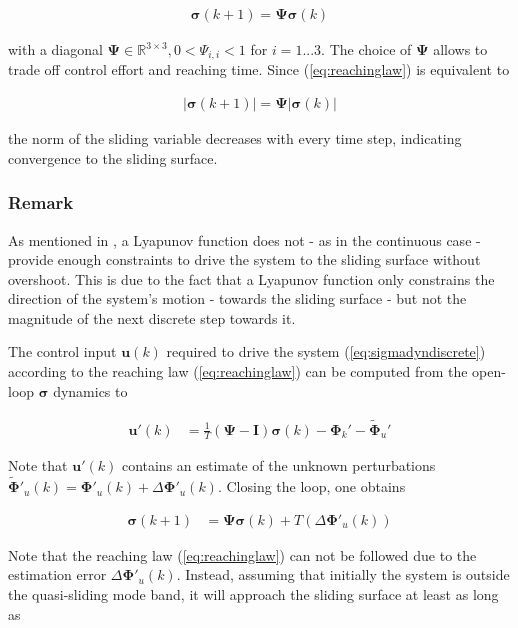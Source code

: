 \documentclass{ifacconf}
\providecommand{\mbf}[1]{\mathbf{#1}}
\newcommand{\idxSample}{{\ensuremath{k}}}
\begin{document}
\begin{align}
\mbf{\sigma}(\idxSample+1) = \mbf{\Psi} \mbf{\sigma}(\idxSample)
\label{eq:reachinglaw}
\end{align}

with a diagonal $\mbf{\Psi} \in \mathbb{R}^{3 \times 3}, 0 < \Psi_{i,i} < 1$ for $i=1...3$. The choice of $\mbf{\Psi}$ allows to trade off control effort and reaching time.
Since (\ref{eq:reachinglaw}) is equivalent to

\begin{align}
|\mbf{\sigma}(\idxSample+1)| = \mbf{\Psi} |\mbf{\sigma}(\idxSample)|
\end{align}

the norm of the sliding variable decreases with every time step, indicating convergence to the sliding surface. 

\subsubsection{Remark} As mentioned in \cite{monsees2001discrete}, a Lyapunov function does not - as in the continuous case - provide enough constraints to drive the system to the sliding surface without overshoot. This is due to the fact that a Lyapunov function only constrains the direction of the system's motion - towards the sliding surface - but not the magnitude of the next discrete step towards it. 

The control input $\mbf{u}(\idxSample)$ required to drive the system (\ref{eq:sigmadyndiscrete}) according to the reaching law (\ref{eq:reachinglaw}) can be computed from the open-loop $\mbf{\sigma}$ dynamics to

\begin{align}
\mbf{u}'(\idxSample) &= \frac{1}{T}(\mbf{\Psi} - \mbf{I})\mbf{\sigma}(\idxSample) - \mbf{\Phi}_k' - \tilde{\mbf{\Phi}}_u'
\end{align}

Note that $\mbf{u}'(\idxSample)$ contains an estimate of the unknown perturbations $\tilde{\mbf{\Phi}}'_u(\idxSample) = \mbf{\Phi}'_u(\idxSample) + \Delta \mbf{\Phi}'_u(\idxSample)$. Closing the loop, one obtains

\begin{align}
\mbf{\sigma}(\idxSample+1) &= \mbf{\Psi} \mbf{\sigma}(\idxSample) +
T (\Delta \mbf{\Phi}'_u(\idxSample))
\end{align}

Note that the reaching law (\ref{eq:reachinglaw}) can not be followed due to the estimation error $\Delta \mbf{\Phi}'_u(\idxSample)$. Instead, assuming that initially the system is outside the quasi-sliding mode band, it will approach the sliding surface at least as long as
\end{document}
